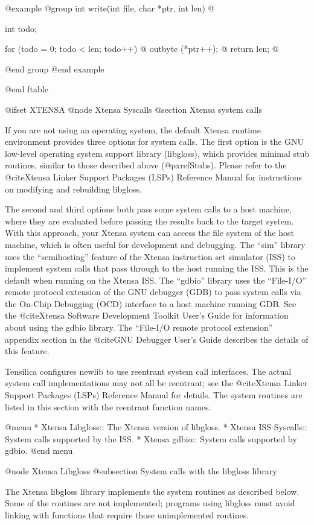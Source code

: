 @example
@group
int write(int file, char *ptr, int len) @{
  int todo;

  for (todo = 0; todo < len; todo++) @{
    outbyte (*ptr++);
  @}
  return len;
@}
@end group
@end example

@end ftable

@ifset XTENSA
@node Xtensa Syscalls
@section Xtensa system calls

If you are not using an operating system, the default Xtensa runtime
environment provides three options for system calls.  The first option
is the GNU low-level operating system support library (libgloss),
which provides minimal stub routines, similar to those described above
(@pxref{Stubs}).  Please refer to the @cite{Xtensa Linker Support
Packages (LSPs) Reference Manual} for instructions on modifying and
rebuilding libgloss.

The second and third options both pass some system calls to a host machine,
where they are evaluated before passing the results back to the target
system.  With this approach, your Xtensa system can access the file system
of the host machine, which is often useful for development and debugging.
The ``sim'' library uses the ``semihosting'' feature of the Xtensa
instruction set simulator (ISS) to implement system calls that pass through
to the host running the ISS.  This is the default when running on the
Xtensa ISS.  The ``gdbio'' library uses the ``File-I/O'' remote protocol
extension of the GNU debugger (GDB) to pass system calls via the On-Chip
Debugging (OCD)
interface to a host machine running GDB.  See the @cite{Xtensa Software
Development Toolkit User's Guide} for information about using the gdbio
library.  The ``File-I/O remote protocol extension'' appendix section in the
@cite{GNU Debugger User's Guide} describes the details of this feature.

Tensilica configures newlib to use reentrant system call interfaces.
The actual system call implementations may not all be reentrant; see
the @cite{Xtensa Linker Support Packages (LSPs) Reference Manual} for
details.  The system routines are listed in this section with the
reentrant function names.

@menu
* Xtensa Libgloss::		The Xtensa version of libgloss.
* Xtensa ISS Syscalls:: 	System calls supported by the ISS.
* Xtensa gdbio::		System calls supported by gdbio.
@end menu

@node Xtensa Libgloss
@subsection System calls with the libgloss library

The Xtensa libgloss library implements the system routines as described
below.  Some of the routines are not implemented; programs using
libgloss must avoid linking with functions that require those
unimplemented routines.

